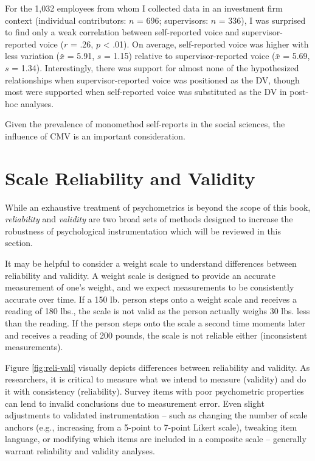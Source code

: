 \documentclass[
]{book}
\begin{document}
For the 1,032 employees from whom I collected data in an investment firm context (individual contributors: \(n\) = 696; supervisors: \(n\) = 336), I was surprised to find only a weak correlation between self-reported voice and supervisor-reported voice (\(r\) = .26, \(p\) \textless{} .01). On average, self-reported voice was higher with less variation (\(\bar{x}\) = 5.91, \(s\) = 1.15) relative to supervisor-reported voice (\(\bar{x}\) = 5.69, \(s\) = 1.34). Interestingly, there was support for almost none of the hypothesized relationships when supervisor-reported voice was positioned as the DV, though most were supported when self-reported voice was substituted as the DV in post-hoc analyses.

Given the prevalence of monomethod self-reports in the social sciences, the influence of CMV is an important consideration.

\hypertarget{scale-reliability-and-validity}{%
\section{Scale Reliability and Validity}\label{scale-reliability-and-validity}}

While an exhaustive treatment of psychometrics is beyond the scope of this book, \emph{reliability} and \emph{validity} are two broad sets of methods designed to increase the robustness of psychological instrumentation which will be reviewed in this section.

It may be helpful to consider a weight scale to understand differences between reliability and validity. A weight scale is designed to provide an accurate measurement of one's weight, and we expect measurements to be consistently accurate over time. If a 150 lb. person steps onto a weight scale and receives a reading of 180 lbs., the scale is not valid as the person actually weighs 30 lbs. less than the reading. If the person steps onto the scale a second time moments later and receives a reading of 200 pounds, the scale is not reliable either (inconsistent measurements).

Figure \ref{fig:reli-vali} visually depicts differences between reliability and validity. As researchers, it is critical to measure what we intend to measure (validity) and do it with consistency (reliability). Survey items with poor psychometric properties can lend to invalid conclusions due to measurement error. Even slight adjustments to validated instrumentation -- such as changing the number of scale anchors (e.g., increasing from a 5-point to 7-point Likert scale), tweaking item language, or modifying which items are included in a composite scale -- generally warrant reliability and validity analyses.
\end{document}
